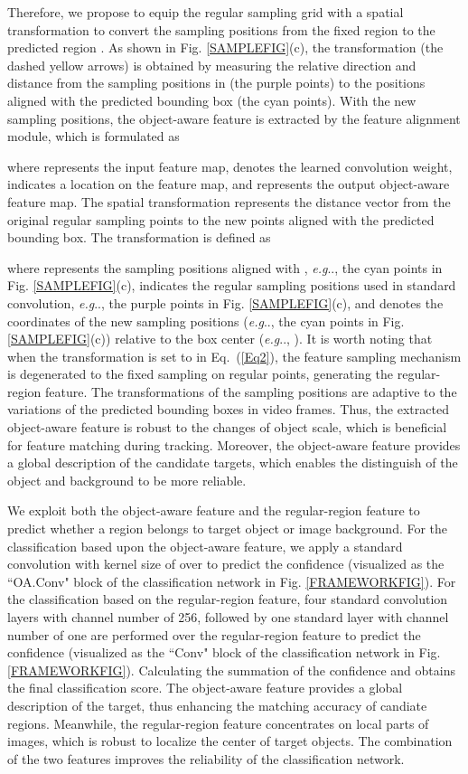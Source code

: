 \documentclass[runningheads]{llncs}
\makeatletter
\DeclareRobustCommand\onedot{\futurelet\@let@token\@onedot}
\def\@onedot{\ifx\@let@token.\else.\null\fi\xspace}
\def\eg{\emph{e.g}\onedot} \def\Eg{\emph{E.g}\onedot}
\makeatother
\begin{document}
Therefore, we propose to equip the regular sampling grid  with a spatial transformation  to convert the sampling positions from the fixed region to the predicted region . 
As shown in Fig. \ref{SAMPLEFIG}(c), the transformation  (the dashed yellow arrows) is obtained by measuring the relative direction and distance from the sampling positions in  (the purple points) to the positions aligned with the predicted bounding box (the cyan points). With the new sampling positions, the object-aware feature is extracted by the feature alignment module, which is formulated as


where  represents the input feature map,  denotes the learned convolution weight,  indicates a location on the feature map, and  represents the output object-aware feature map. The spatial transformation  represents the distance vector from the original regular sampling points to the new points aligned with the predicted bounding box. The transformation is defined as

where  represents the   sampling positions aligned with , \eg, the cyan points in Fig. \ref{SAMPLEFIG}(c),   indicates the regular sampling positions used in standard convolution, \eg, the purple points in Fig. \ref{SAMPLEFIG}(c), and  denotes the coordinates of the new sampling positions (\eg, the cyan points in Fig. \ref{SAMPLEFIG}(c)) relative to the box center (\eg, ).
It is worth noting that when the transformation  is set to  in Eq.~(\ref{Eq2}), the feature sampling mechanism is degenerated to the fixed sampling on regular points, generating the regular-region feature.  The transformations of the sampling positions are adaptive to the variations
of the predicted bounding boxes in video frames. Thus, the extracted object-aware
feature is robust to the changes of object scale, which is beneficial for feature matching during tracking. Moreover, the object-aware feature provides
a global description of the candidate targets, which enables the distinguish of the object and background to be more reliable.


We exploit both the object-aware feature and the regular-region feature to predict whether a 
region belongs to target object or image background. 
For the classification based upon the object-aware feature, we apply a standard convolution with kernel size of  over  to predict the confidence  (visualized as the ``OA.Conv" block of the classification network in Fig. \ref{FRAMEWORKFIG}). For the classification based on the regular-region feature, four  standard convolution layers with channel number of 256, followed by one standard  layer with channel number of one are performed over the regular-region feature  to predict the confidence  (visualized as the ``Conv" block of the classification network in Fig. \ref{FRAMEWORKFIG}). Calculating the summation of the confidence  and  obtains the final classification score. The object-aware feature provides a global description of the target, thus enhancing the matching accuracy of candiate regions. Meanwhile, the regular-region feature concentrates on local parts of images, which is robust to localize the center of target objects. The combination of the two features improves the reliability of the classification network.
\end{document}
